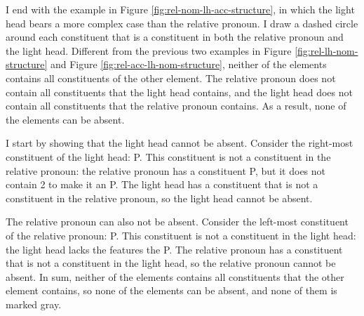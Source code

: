 I end with the example in Figure \ref{fig:rel-nom-lh-acc-structure}, in which the light head bears a more complex case than the relative pronoun.
I draw a dashed circle around each constituent that is a constituent in both the relative pronoun and the light head. Different from the previous two examples in Figure \ref{fig:rel-lh-nom-structure} and Figure \ref{fig:rel-acc-lh-nom-structure}, neither of the elements contains all constituents of the other element. The relative pronoun does not contain all constituents that the light head contains, and the light head does not contain all constituents that the relative pronoun contains. As a result, none of the elements can be absent.

I start by showing that the light head cannot be absent.
Consider the right-most constituent of the light head: P. This constituent is not a constituent in the relative pronoun: the relative pronoun has a constituent P, but it does not contain 2 to make it an P.
The light head has a constituent that is not a constituent in the relative pronoun, so the light head cannot be absent.

The relative pronoun can also not be absent.
Consider the left-most constituent of the relative pronoun: P. This constituent is not a constituent in the light head: the light head lacks the features the P.
The relative pronoun has a constituent that is not a constituent in the light head, so the relative pronoun cannot be absent.
In sum, neither of the elements contains all constituents that the other element contains, so none of the elements can be absent, and none of them is marked gray.

